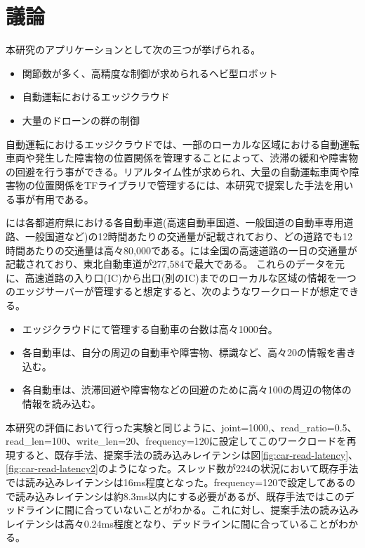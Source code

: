 \documentclass[a4paper]{jreport}	%
\begin{document}
\chapter{議論}
本研究のアプリケーションとして次の三つが挙げられる。
\begin{itemize}
	\item 関節数が多く、高精度な制御が求められるヘビ型ロボット
	\item 自動運転におけるエッジクラウド
	\item 大量のドローンの群の制御
\end{itemize}

自動運転におけるエッジクラウドでは、一部のローカルな区域における自動運転車両や発生した障害物の位置関係を管理することによって、渋滞の緩和や障害物の回避を行う事ができる。リアルタイム性が求められ、大量の自動運転車両や障害物の位置関係をTFライブラリで管理するには、本研究で提案した手法を用いる事が有用である。

\cite{nexco}には各都道府県における各自動車道(高速自動車国道、一般国道の自動車専用道路、一般国道など)の12時間あたりの交通量が記載されており、どの道路でも12時間あたりの交通量は高々80,000である。\cite{load}には全国の高速道路の一日の交通量が記載されており、東北自動車道が277,584で最大である。
これらのデータを元に、高速道路の入り口(IC)から出口(別のIC)までのローカルな区域の情報を一つのエッジサーバーが管理すると想定すると、次のようなワークロードが想定できる。

\begin{itemize}
	\item エッジクラウドにて管理する自動車の台数は高々1000台。
	\item 各自動車は、自分の周辺の自動車や障害物、標識など、高々20の情報を書き込む。
	\item 各自動車は、渋滞回避や障害物などの回避のために高々100の周辺の物体の情報を読み込む。
\end{itemize}

本研究の評価において行った実験と同じように、joint=1000,、read\_ratio=0.5、read\_len=100、write\_len=20、frequency=120に設定してこのワークロードを再現すると、既存手法、提案手法の読み込みレイテンシは図\ref{fig:car-read-latency}、\ref{fig:car-read-latency2}のようになった。スレッド数が224の状況において既存手法では読み込みレイテンシは16ms程度となった。frequency=120で設定してあるので読み込みレイテンシは約8.3ms以内にする必要があるが、既存手法ではこのデッドラインに間に合っていないことがわかる。これに対し、提案手法の読み込みレイテンシは高々0.24ms程度となり、デッドラインに間に合っていることがわかる。
\end{document}
